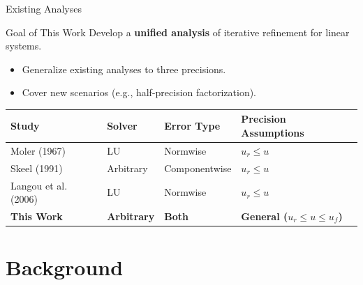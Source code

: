 \documentclass[
	11pt,
	aspectratio=169,
]{beamer}
\begin{document}
\begin{frame}{Existing Analyses}
    \begin{block}{Goal of This Work}
Develop a \textbf{unified analysis} of iterative refinement for linear systems.
\begin{itemize}
    \item Generalize existing analyses to three precisions.
    \item Cover new scenarios (e.g., half-precision factorization).
\end{itemize}
\end{block}

\begin{table}
\centering
\begin{tabular}{l l l l}
\toprule
\textbf{Study} & \textbf{Solver} & \textbf{Error Type} & \textbf{Precision Assumptions} \\
\midrule
Moler (1967) & LU & Normwise & $u_r \leq u$ \\
Skeel (1991) & Arbitrary & Componentwise & $u_r \leq u$ \\
Langou et al. (2006) & LU & Normwise & $u_r \leq u$ \\
\midrule
\textbf{This Work} & \textbf{Arbitrary} & \textbf{Both} & \textbf{General ($u_r \leq u \leq u_f$)} \\
\bottomrule
\end{tabular}
\end{table}
\end{frame}


\section{Background}
\end{document}
